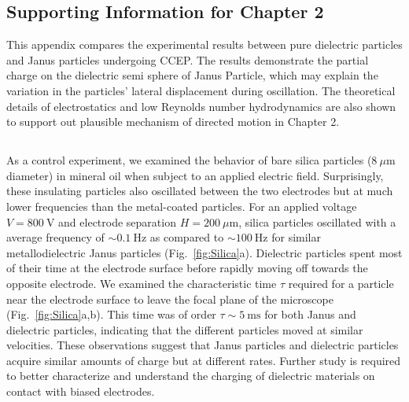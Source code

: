 \begin{appendices}



\chapter{Supporting Information for Chapter 2}
This appendix compares the experimental results between pure dielectric particles and  Janus particles undergoing CCEP. The results demonstrate the partial charge on the dielectric semi sphere of Janus Particle, which may explain the variation in the particles’ lateral displacement during oscillation. The theoretical details of electrostatics and low Reynolds number hydrodynamics are also shown to support out plausible mechanism of directed motion in Chapter 2.  


\section{}


\subsection{} \label{sec:Dielectric}

As a control experiment, we examined the behavior of bare silica particles ($8~\mu\text{m}$ diameter) in mineral oil when subject to an applied electric field.
Surprisingly, these insulating particles also oscillated between the two electrodes but at much lower frequencies than the metal-coated particles.
For an applied voltage $V=800~\text{V}$ and electrode separation $H=200~\mu\text{m}$, silica particles oscillated with a average frequency of ${\sim}0.1~\text{Hz}$ as compared to ${\sim}100~\text{Hz}$ for similar metallodielectric Janus particles (Fig.~\ref{fig:Silica}a). 
Dielectric particles spent most of their time at the electrode surface before rapidly moving off towards the opposite electrode.
We examined the characteristic time $\tau$ required for a particle near the electrode surface to leave the focal plane of the microscope (Fig.~\ref{fig:Silica}a,b).
This time was of order $\tau\sim 5~\text{ms}$ for both Janus and dielectric particles, indicating that the different particles moved at similar velocities.
These observations suggest that Janus particles and dielectric particles acquire similar amounts of charge but at different rates.
Further study is required to better characterize and understand the charging of dielectric materials on contact with biased electrodes.


\end{appendices}
